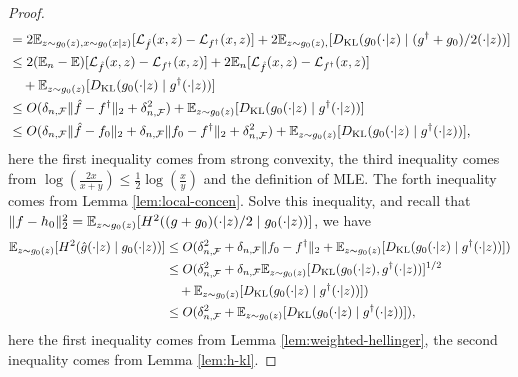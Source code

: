 \begin{proof}
\begin{align*}
    &= 2\mathbb{E}_{z\sim g_0(z), x\sim g_0(x|z)}[\mathcal{L}_{\hat{f}}(x,z) - \mathcal{L}_{f^{\dagger}}(x,z)] + 2\mathbb{E}_{z\sim g_0(z), }[D_{\text{KL}}(g_0(\cdot|z)\mid(g^{\dagger}+g_0)/2(\cdot|z) )]\\
    &\leq 2(\mathbb{E}_n - \mathbb{E})[\mathcal{L}_{\hat{f}}(x,z) - \mathcal{L}_{f^\dagger}(x,z)] + 2\mathbb{E}_n[\mathcal{L}_{\hat{f}}(x,z) - \mathcal{L}_{f^\dagger}(x,z)]\\
    &\quad+ \mathbb{E}_{z\sim g_0(z) }[D_{\text{KL}}(g_0(\cdot|z)\mid g^{\dagger}(\cdot|z) )] \\
    &\leq O(\delta_{n,\mathcal{F}}\|\hat{f} - f^{\dagger}\|_2 +\delta_{n,\mathcal{F}}^2 ) +   \mathbb{E}_{z\sim g_0(z) }[D_{\text{KL}}(g_0(\cdot|z)\mid g^{\dagger}(\cdot|z) )]\\
    &\leq O(\delta_{n,\mathcal{F}}\|\hat{f} - f_0\|_2 +\delta_{n,\mathcal{F}}\|f_0 - f^{\dagger}\|_2 +\delta_{n,\mathcal{F}}^2 ) +   \mathbb{E}_{z\sim g_0(z) }[D_{\text{KL}}(g_0(\cdot|z)\mid g^{\dagger}(\cdot|z) )],
\end{align*}
here the first inequality comes from strong convexity, the third inequality comes from $\log(\frac{2x}{x+y})\leq \frac{1}{2}\log(\frac{x}{y})$ and the definition of MLE. The forth inequality comes from Lemma \ref{lem:local-concen}. Solve this inequality, and recall that $\|f - h_0\|_2^2 = \mathbb{E}_{z\sim g_0(z)}[H^2((g+g_0)(\cdot|z)/2\mid g_0(\cdot|z))]$, we have \begin{align*}
\mathbb{E}_{z\sim g_0(z)}[H^2(\hat{g}(\cdot|z)\mid g_0(\cdot|z))]&\leq O(\delta_{n,\mathcal{F}}^2 + \delta_{n,\mathcal{F}}\|f_0 - f^{\dagger}\|_2+ \mathbb{E}_{z\sim g_0(z)}[D_{\text{KL}}(g_0(\cdot|z)\mid g^{\dagger}(\cdot|z) )])\\
&\leq O(\delta_{n,\mathcal{F}}^2 + \delta_{n,\mathcal{F}}\mathbb{E}_{z\sim g_0(z)}[D_{\text{KL}}(g_0(\cdot|z), g^{\dagger}(\cdot|z) )]^{1/2}\\
&\quad+\mathbb{E}_{z\sim g_0(z)}[D_{\text{KL}}(g_0(\cdot|z)\mid g^{\dagger}(\cdot|z) )])\\
&\leq O(\delta_{n,\mathcal{F}}^2+\mathbb{E}_{z\sim g_0(z)}[D_{\text{KL}}(g_0(\cdot|z)\mid g^{\dagger}(\cdot|z) )]),
\end{align*}
here the first inequality comes from Lemma \ref{lem:weighted-hellinger}, the second inequality comes from Lemma \ref{lem:h-kl}.

\end{proof}
